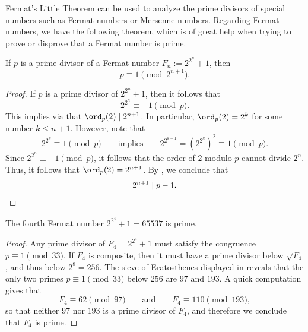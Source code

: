 Fermat's Little Theorem can be used to analyze the prime divisors of special numbers such as Fermat numbers or Mersenne numbers. Regarding Fermat numbers, we have the following theorem, which is of great help when trying to prove or disprove that a Fermat number is prime.

\begin{theorem}\label{theorem:prime-divisors-fermat-numbers}
  If $p$ is a prime divisor of a Fermat number $F_n:=2^{2^n}+1$, then
  \begin{equation*}
    p\equiv 1\pmod{2^{n+1}}.
  \end{equation*}
\end{theorem}

\begin{proof}
  If $p$ is a prime divisor of $2^{2^n}+1$, then it follows that
  \begin{equation*}
    2^{2^n}\equiv -1\pmod{p}.
  \end{equation*}
  This implies via  that $\ord_p(2)\mid 2^{n+1}$. In particular, $\ord_p(2)=2^k$ for some number $k\leq n+1$. However, note that
  \begin{equation*}
    2^{2^k}\equiv 1\pmod{p}\qquad\text{implies}\qquad 2^{2^{k+1}}= (2^{2^k})^2\equiv 1 \pmod{p}.
  \end{equation*}
  Since $2^{2^{n}}\equiv -1\pmod{p}$, it follows that the order of $2$ modulo $p$ cannot divide $2^n$. Thus, it follows that $\ord_p(2)=2^{n+1}$. By , we conclude that
  \begin{equation*}
    2^{n+1}\mid p-1.\qedhere
  \end{equation*}
\end{proof}

\begin{corollary}\label{corollary:F4}
  The fourth Fermat number $2^{2^4}+1=65537$ is prime.
\end{corollary}

\begin{proof}
  Any prime divisor of $F_4=2^{2^4}+1$ must satisfy the congruence $p\equiv 1\pmod{33}$. If $F_4$ is composite, then it must have a prime divisor below $\sqrt{F_4}$, and thus below $2^8=256$. The sieve of Eratosthenes displayed in  reveals that the only two primes $p\equiv 1\pmod{33}$ below $256$ are $97$ and $193$. A quick computation gives that
  \begin{equation*}
    F_4\equiv 62\pmod{97}\qquad\text{and}\qquad F_4\equiv 110\pmod{193},
  \end{equation*}
  so that neither $97$ nor $193$ is a prime divisor of $F_4$, and therefore we conclude that $F_4$ is prime.
\end{proof}

